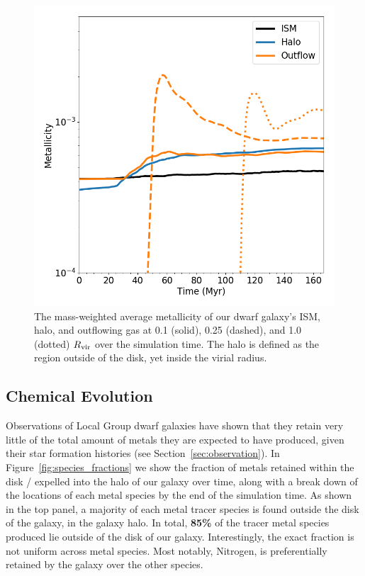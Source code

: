 \documentclass[twocolumn]{aastex61}
\begin{document}
\begin{figure}
\centering
\includegraphics[width=0.95\linewidth]{metallicity_evolution}
\caption{The mass-weighted average metallicity of our dwarf galaxy's ISM, halo, and outflowing gas at 0.1 (solid), 0.25 (dashed), and 1.0 (dotted) $R_{\rm vir}$ over the simulation time. The halo is defined as the region outside of the disk, yet inside the virial radius.}
\label{fig:outflow_metallicity}
\end{figure}

\subsection{Chemical Evolution} 
\label{sec:chemical evolution}
Observations of Local Group dwarf galaxies have shown that they retain very little of the total amount of metals they are expected to have produced, given their star formation histories (see Section~\ref{sec:observation}). In Figure~\ref{fig:species_fractions} we show the fraction of metals retained within the disk / expelled into the halo of our galaxy over time, along with a break down of the locations of each metal species by the end of the simulation time. As shown in the top panel, a majority of each metal tracer species is found outside the disk of the galaxy, in the galaxy halo. In total, \textbf{85\%} of the tracer metal species produced lie outside of the disk of our galaxy. Interestingly, the exact fraction is not uniform across metal species. Most notably, Nitrogen, is preferentially retained by the galaxy over the other species. 
\end{document}
